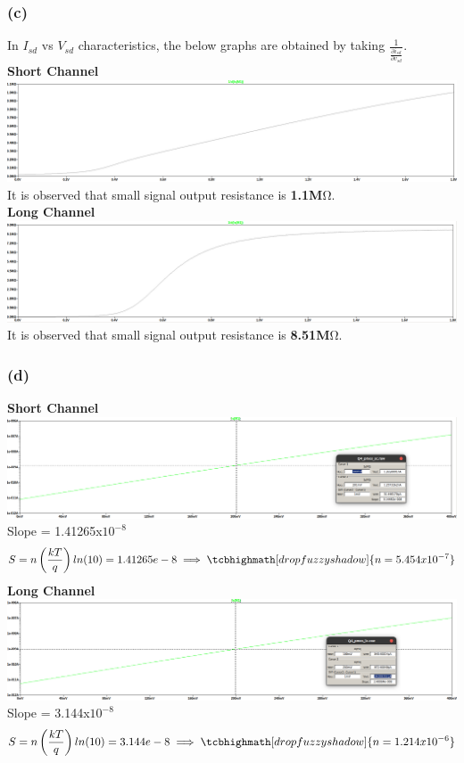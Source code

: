 \documentclass{article}
\begin{document}
\subsubsection*{(c)}
In $I_{sd}$ vs $V_{sd}$ characteristics, the below graphs are obtained by taking $\frac{1}{\frac{\partial i_{sd}}{\partial v_{sd}}}$.\\
\textbf{Short Channel}\\
\includegraphics[scale=0.28]{./figs/Q4_pmos_sc_c.png}\\
It is observed that small signal output resistance is \textbf{1.1M$\si{\ohm}$}.\\
 \newline
\textbf{Long Channel}\\
\includegraphics[scale=0.28]{./figs/Q4_pmos_lc_c.png}\\
It is observed that small signal output resistance is \textbf{8.51M$\si{\ohm}$}.

\subsubsection*{(d)}
\textbf{Short Channel}\\
\includegraphics[scale=0.28]{./figs/Q4_pmos_sc_sub.png}\\
Slope = 1.41265x$10^{-8}$
\begin{gather*}
S = n\left(\frac{kT}{q}\right)ln(10) = 1.41265e-8
\implies \tcbhighmath[drop fuzzy shadow]{n = 5.454x10^{-7}}
\end{gather*}
 \newline
\textbf{Long Channel}\\
\includegraphics[scale=0.28]{./figs/Q4_pmos_lc_sub.png}
Slope = 3.144x$10^{-8}$
\begin{gather*}
S = n\left(\frac{kT}{q}\right)ln(10) = 3.144e-8
\implies \tcbhighmath[drop fuzzy shadow]{n = 1.214x10^{-6}}
\end{gather*}		
\end{document}

